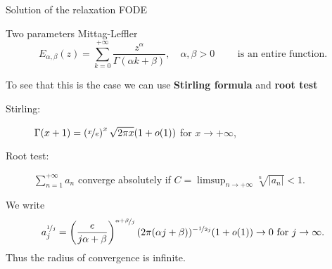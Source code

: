 \documentclass[aspectratio=169,xcolor=dvipsnames]{beamer}
\begin{document}
\begin{frame}{Solution of the relaxation FODE}
\begin{exampleblock}{Two parameters Mittag-Leffler}
	\[
	E_{\alpha,\beta}(z) = \sum_{k=0}^{+\infty} \frac{z^\alpha}{\Gamma(\alpha k + \beta)}, \quad \alpha,\beta > 0 \qquad \text{ is an entire function.}
	\]
\end{exampleblock}

To see that this is the case we can use \textbf{Stirling formula} and \textbf{root test}
\begin{description}
	\item[Stirling:] $\Gamma(x+1) = \left(\nicefrac{x}{e}\right)^x \sqrt{2\pi x}(1 + o(1))$ for $x \rightarrow +\infty$,
	\item[Root test:] $\sum_{n=1}^{+\infty} a_n$ converge absolutely if $C = \limsup_{n \rightarrow + \infty} \sqrt[n]{|a_n|} < 1$.
\end{description}
We write
\[
a_j^{\nicefrac{1}{j}} = \left( \frac{e}{j\alpha + \beta} \right)^{ \nicefrac{\alpha+\beta}{j} } (2\pi(\alpha j + \beta))^{-\nicefrac{1}{2j}} (1+o(1)) \rightarrow 0 \text{ for } j \rightarrow \infty.
\]
Thus the \alert{radius of convergence} is infinite.
\end{frame}
\end{document}
